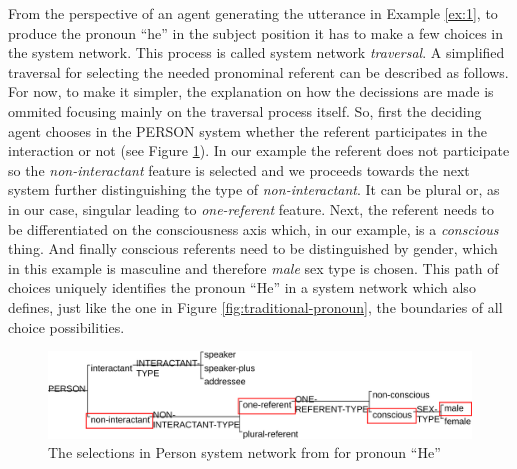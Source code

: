 From the perspective of an agent generating the utterance in Example \ref{ex:1}, to produce the pronoun ``he'' in the subject position it has to make a few choices in the system network. This process is called system network \textit{traversal}. A simplified traversal for selecting the needed pronominal referent can be described as follows. For now, to make it simpler, the explanation on how the decissions are made is ommited focusing mainly on the traversal process itself. So, first the deciding agent chooses in the PERSON system whether the referent participates in the interaction or not (see Figure \ref{fig:person-system-network}). In our example the referent does not participate so the \textit{non-interactant} feature is selected and we proceeds towards the next system further distinguishing the type of \textit{non-interactant}. It can be plural or, as in our case, singular leading to \textit{one-referent} feature. Next, the referent needs to be differentiated on the consciousness axis which, in our example, is a \textit{conscious} thing. And finally conscious referents need to be distinguished by gender, which in this example is masculine and therefore \textit{male} sex type is chosen. This path of choices uniquely identifies the pronoun ``He'' in a system network which also defines, just like the one in Figure \ref{fig:traditional-pronoun}, the boundaries of all choice possibilities.
 
\begin{figure}[!ht]
    \centering      
    \includegraphics[width=.90\textwidth]{Figures/Example/person-selections.pdf}      
    \caption{The selections in Person system network from \citet[366]{Halliday2013} for pronoun ``He''}
    \label{fig:person-system-network}
\end{figure}


